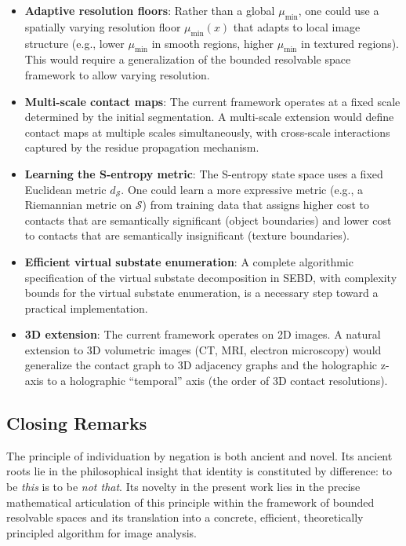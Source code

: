 \documentclass[twocolumn]{article}
\theoremstyle{plain}
\theoremstyle{definition}
\newcommand{\ScS}{\mathcal{S}}
\newcommand{\dS}{d_{\mathcal{S}}}
\newcommand{\mumin}{\mu_{\min}}
\begin{document}
\begin{itemize}
\item \textbf{Adaptive resolution floors}: Rather than a global $\mumin$, one
  could use a spatially varying resolution floor $\mumin(x)$ that adapts to
  local image structure (e.g., lower $\mumin$ in smooth regions, higher $\mumin$
  in textured regions). This would require a generalization of the bounded
  resolvable space framework to allow varying resolution.

\item \textbf{Multi-scale contact maps}: The current framework operates at a
  fixed scale determined by the initial segmentation. A multi-scale extension
  would define contact maps at multiple scales simultaneously, with cross-scale
  interactions captured by the residue propagation mechanism.

\item \textbf{Learning the S-entropy metric}: The S-entropy state space uses a
  fixed Euclidean metric $\dS$. One could learn a more expressive metric
  (e.g., a Riemannian metric on $\ScS$) from training data that assigns higher
  cost to contacts that are semantically significant (object boundaries) and
  lower cost to contacts that are semantically insignificant (texture boundaries).

\item \textbf{Efficient virtual substate enumeration}: A complete algorithmic
  specification of the virtual substate decomposition in SEBD, with complexity
  bounds for the virtual substate enumeration, is a necessary step toward a
  practical implementation.

\item \textbf{3D extension}: The current framework operates on 2D images. A
  natural extension to 3D volumetric images (CT, MRI, electron microscopy) would
  generalize the contact graph to 3D adjacency graphs and the holographic z-axis
  to a holographic ``temporal'' axis (the order of 3D contact resolutions).
\end{itemize}

\subsection{Closing Remarks}

The principle of individuation by negation is both ancient and novel. Its ancient
roots lie in the philosophical insight that identity is constituted by difference:
to be \emph{this} is to be \emph{not that}. Its novelty in the present work
lies in the precise mathematical articulation of this principle within the
framework of bounded resolvable spaces and its translation into a concrete,
efficient, theoretically principled algorithm for image analysis.
\end{document}
